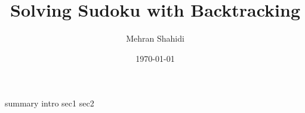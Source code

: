 \documentclass{article}
\title{Solving Sudoku with Backtracking}
\author{Mehran Shahidi}
\date{\today}
\begin{document}
\maketitle
{}
{summary}
\newpage
\tableofcontents
\newpage
{}
{intro}
{sec1}
{sec2}

\newpage
\end{document}
